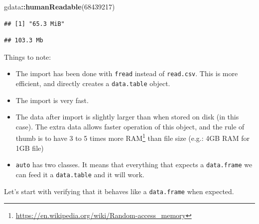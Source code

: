 \documentclass[]{book}
\newenvironment{Shaded}{\begin{snugshade}}{\end{snugshade}}
\newcommand{\CommentTok}[1]{\textcolor[rgb]{0.56,0.35,0.01}{\textit{#1}}}
\newcommand{\DataTypeTok}[1]{\textcolor[rgb]{0.13,0.29,0.53}{#1}}
\newcommand{\DecValTok}[1]{\textcolor[rgb]{0.00,0.00,0.81}{#1}}
\newcommand{\KeywordTok}[1]{\textcolor[rgb]{0.13,0.29,0.53}{\textbf{#1}}}
\newcommand{\NormalTok}[1]{#1}
\newcommand{\OperatorTok}[1]{\textcolor[rgb]{0.81,0.36,0.00}{\textbf{#1}}}
\newcommand{\StringTok}[1]{\textcolor[rgb]{0.31,0.60,0.02}{#1}}
\providecommand{\tightlist}{%
  \setlength{\itemsep}{0pt}\setlength{\parskip}{0pt}}
\renewcommand{\href}[2]{#2\footnote{\url{#1}}}
\theoremstyle{definition}
\theoremstyle{definition}
\theoremstyle{definition}
\theoremstyle{remark}
\begin{document}
\begin{Shaded}
\begin{Highlighting}[]
\NormalTok{gdata}\OperatorTok{::}\KeywordTok{humanReadable}\NormalTok{(}\DecValTok{68439217}\NormalTok{)}
\end{Highlighting}
\end{Shaded}

\begin{verbatim}
## [1] "65.3 MiB"
\end{verbatim}

\begin{Shaded}
\end{Shaded}

\begin{verbatim}
## 103.3 Mb
\end{verbatim}

Things to note:

\begin{itemize}
\tightlist
\item
  The import has been done with \texttt{fread} instead of \texttt{read.csv}. This is more efficient, and directly creates a \texttt{data.table} object.
\item
  The import is very fast.
\item
  The data after import is slightly larger than when stored on disk (in this case). The extra data allows faster operation of this object, and the rule of thumb is to have 3 to 5 times more \href{https://en.wikipedia.org/wiki/Random-access_memory}{RAM} than file size (e.g.: 4GB RAM for 1GB file)
\item
  \texttt{auto} has two classes. It means that everything that expects a \texttt{data.frame} we can feed it a \texttt{data.table} and it will work.
\end{itemize}

Let's start with verifying that it behaves like a \texttt{data.frame} when expected.

\begin{Shaded}
\end{Shaded}
\end{document}
